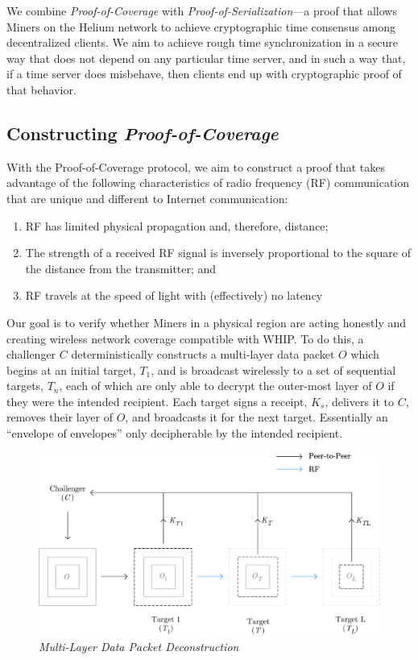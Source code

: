 \documentclass[10pt, nonatbib, nocopyrightspace, reprint]{sigplanconf}
\begin{document}
We combine \emph{Proof-of-Coverage} with \emph{Proof-of-Serialization}---a proof that allows Miners on the Helium network to achieve cryptographic time consensus among decentralized clients. We aim to achieve rough time synchronization in a secure way that does not depend on any particular time server, and in such a way that, if a time server does misbehave, then clients end up with cryptographic proof of that behavior.

\subsection{Constructing \emph{Proof-of-Coverage}}

With the Proof-of-Coverage protocol, we aim to construct a proof that takes advantage of the following characteristics of radio frequency (RF) communication that are unique and different to Internet communication:

\begin{enumerate}
    \item RF has limited physical propagation and, therefore, distance;
    \item The strength of a received RF signal is inversely proportional to the square of the distance from the transmitter; and
    \item RF travels at the speed of light with (effectively) no latency
\end{enumerate}

Our goal is to verify whether Miners in a physical region are acting honestly and creating wireless network coverage compatible with WHIP. To do this, a challenger $C$ deterministically constructs a multi-layer data packet $O$ which begins at an initial target, $T_1$, and is broadcast wirelessly to a set of sequential targets, $T_n$, each of which are only able to decrypt the outer-most layer of $O$ if they were the intended recipient. Each target signs a receipt, $K_s$, delivers it to $C$, removes their layer of $O$, and broadcasts it for the next target. Essentially an ``envelope of envelopes'' only decipherable by the intended recipient.

\begin{figure}[ht]
    \begin{center}
          \includegraphics[width=\columnwidth]{deconstruction.eps}
          \caption{\emph{Multi-Layer Data Packet Deconstruction}}\label{fig:poc-deconstruction}
     \end{center}
\end{figure}
\end{document}
